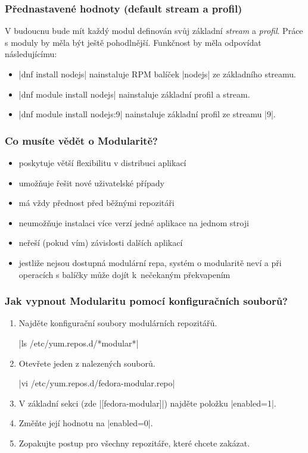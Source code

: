 \documentclass[12pt]{beamer}
\begin{document}
\begin{frame}[fragile]
\frametitle{Přednastavené hodnoty (default stream a profil)}

V budoucnu bude mít každý modul definován svůj základní \textit{stream} a \textit{profil}. Práce s moduly by měla být ještě pohodlnější. Funkčnost by měla odpovídat následujícímu:

\begin{itemize}
	\item \tc|dnf install nodejs| nainstaluje RPM balíček \tc|nodejs| ze základního streamu.
	\item \tc|dnf module install nodejs| nainstaluje základní profil a stream.
	\item \tc|dnf module install nodejs:9| nainstaluje základní profil ze streamu \tc|9|.
\end{itemize}
\end{frame}

\begin{frame}
\frametitle{Co musíte vědět o Modularitě?}

\begin{itemize}
	\item poskytuje větší flexibilitu v distribuci aplikací
	\item umožňuje řešit nové uživatelské případy
	\item má vždy přednost před běžnými repozitáři
	\item neumožňuje instalaci více verzí jedné aplikace na jednom stroji
	\item neřeší (pokud vím) závislosti dalších aplikací
	\item jestliže nejsou dostupná modulární repa, systém o modularitě neví a při operacích s balíčky může dojít k~nečekaným překvapením 
\end{itemize}
\end{frame}

\begin{frame}[fragile]
\frametitle{Jak vypnout Modularitu pomocí konfiguračních souborů?}

\begin{enumerate}
	\item Najděte konfigurační soubory modulárních repozitářů.
	
	\tc|ls /etc/yum.repos.d/*modular*|
	\item Otevřete jeden z nalezených souborů.
	
	\tc|vi /etc/yum.repos.d/fedora-modular.repo|
	\item V základní sekci (zde \tc|[fedora-modular]|) najděte položku \tc|enabled=1|.
	\item Změňte její hodnotu na \tc|enabled=0|.
	\item Zopakujte postup pro všechny repozitáře, které chcete zakázat.
\end{enumerate}
\end{frame}
\end{document}
